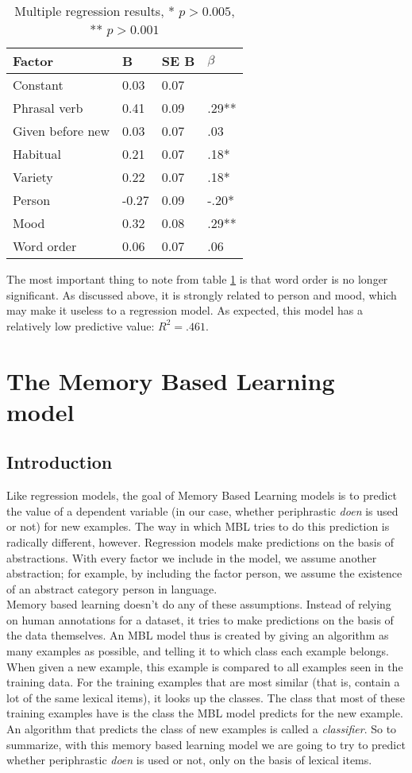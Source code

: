 \documentclass[12pt]{article}
\begin{document}
\begin{table}[h] \centering
\begin{tabular}{|l||l|l|l|}
\hline
Factor&B&SE B& $\beta$ \\
\hline
Constant&0.03&0.07&\\
Phrasal verb&0.41&0.09&.29**\\
Given before new&0.03&0.07&.03\\
Habitual&0.21&0.07&.18*\\
Variety&0.22&0.07&.18*\\
Person&-0.27&0.09&-.20*\\
Mood&0.32&0.08&.29**\\
Word order&0.06&0.07&.06\\
\hline
\end{tabular}
\caption{Multiple regression results, * $ p > 0.005$, **  $p > 0.001$ }
\label{restable}
\end{table}
The most important thing to note from table \ref{restable} is that word order is no longer significant. As discussed above, it is strongly related to person and mood, which may make it useless to a regression model. As expected, this model has a relatively low predictive value: $R^2 = .461$.\\\indent

\section{The Memory Based Learning model} \label{mbl}

\subsection{Introduction}

Like regression models, the goal of Memory Based Learning models is to predict the value of a dependent variable (in our case, whether periphrastic \emph{doen} is used or not) for new examples. The way in which MBL tries to do this prediction is radically different, however. Regression models make predictions on the basis of abstractions. With every factor we include in the model, we assume another abstraction; for example, by including the factor person, we assume the existence of an abstract category person in language.\\\indent
Memory based learning doesn't do any of these assumptions. Instead of relying on human annotations for a dataset, it tries to make predictions on the basis of the data themselves. An MBL model thus is created by giving an algorithm as many examples as possible, and telling it to which class each example belongs. When given a new example, this example is compared to all examples seen in the training data. For the training examples that are most similar (that is, contain a lot of the same lexical items), it looks up the classes. The class that most of these training examples have is the class the MBL model predicts for the new example. An algorithm that predicts the class of new examples is called a \emph{classifier}. So to summarize, with this memory based learning model we are going to try to predict whether periphrastic \emph{doen} is used or not, only on the basis of lexical items.
\end{document}
